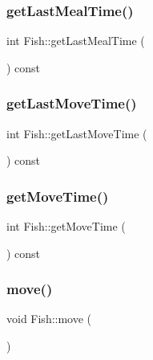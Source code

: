 \mbox{\label{class_fish_a078c712871cc4e9f7d3ed98a6c95f12e}} 
\subsubsection{\texorpdfstring{get\+Last\+Meal\+Time()}{getLastMealTime()}}
{\footnotesize\ttfamily int Fish\+::get\+Last\+Meal\+Time (\begin{DoxyParamCaption}{ }\end{DoxyParamCaption}) const}

\mbox{\label{class_fish_a4ddf35ce18487be8976ba505e50693b2}} 
\subsubsection{\texorpdfstring{get\+Last\+Move\+Time()}{getLastMoveTime()}}
{\footnotesize\ttfamily int Fish\+::get\+Last\+Move\+Time (\begin{DoxyParamCaption}{ }\end{DoxyParamCaption}) const}

\mbox{\label{class_fish_a3a337242dce822aeb5a0e063d7b99e39}} 
\subsubsection{\texorpdfstring{get\+Move\+Time()}{getMoveTime()}}
{\footnotesize\ttfamily int Fish\+::get\+Move\+Time (\begin{DoxyParamCaption}{ }\end{DoxyParamCaption}) const}

\mbox{\label{class_fish_a1a18368573aab3b14a83aaf2424630ec}} 
\subsubsection{\texorpdfstring{move()}{move()}}
{\footnotesize\ttfamily void Fish\+::move (\begin{DoxyParamCaption}{ }\end{DoxyParamCaption})\hspace{0.3cm}{\ttfamily [virtual]}}



